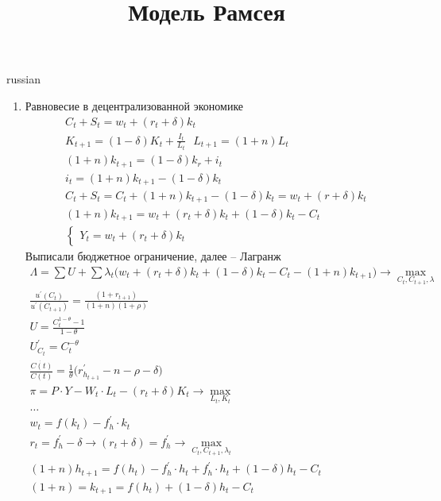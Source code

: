 \documentclass{article}
\begin{document}
\title{\foreignlanguage{russian}{Модель Рамсея}}
\maketitle
\begin{otherlanguage*}{russian}
\begin{enumerate}
\item Равновесие в децентрализованной экономике
\begin{align*}
C_t + S_t = w_t + (r_t + \delta) k_t \\
K_{t+1} = (1 - \delta) K_t + \frac{I_t}{L_t} \,\,\,\, L_{t+1} = (1 + n) L_t \\
(1 + n) k_{t+1} = (1 - \delta) k_r + i_t \\ 
i_t = (1 + n) k_{t+1} - (1 - \delta) k_t \\ 
C_t + S_t = C_t + (1 + n) k_{t+1} - (1 - \delta) k_t = w_t + (r + \delta) k_t \\
(1 + n) k_{t+1} = w_t + (r_t + \delta) k_t + (1 - \delta) k_t - C_t  \\
\begin{cases}
Y_t = w_t + (r_t + \delta) k_t 
\end{cases}
\end{align*}
Выписали бюджетное ограничение, далее -- Лагранж
\begin{align*}
\Lambda = \sum U + \sum \lambda_t \Big( w_t + (r_t + \delta) k_t + (1 - \delta) k_t - C_t - (1+n) k_{t+1} \Big) \rightarrow \max_{C_t, C_{t+1}, \lambda} \\
\frac{u^{'}(C_t)}{u^{'}(C_{t+1})} = \frac{(1 + r_{t+1})}{(1+n) (1 + \rho)} \\
U = \frac{C_t^{1 - \theta} - 1 }{1 - \theta} \\
U^{'}_{C_t} = C_t^{-\theta} \\
\frac{\dot{C(t)}}{C(t)} = \frac{1}{\theta} \Big( r^{'}_{h_{t+1}} - n -\rho - \delta \Big) \\
\pi = P \cdot Y - W_t \cdot L_t - (r_t + \delta) K_t \rightarrow \max_{L_t, K_t} \\
\ldots \\
w_t = f(k_t) - f^{'}_h \cdot k_t \\ 
r_t = f^{'}_h - \delta \rightarrow (r_t + \delta) = f^{'}_h \rightarrow \max_{C_t, C_{t+1}, \lambda_t} \\
(1 + n) h_{t+1} = f(h_t) - f^{'}_h \cdot h_t + f^{'}_h \cdot h_t + (1 - \delta) h_t - C_t \\
(1 + n) = k_{t+1} = f(h_t) + (1 - \delta) h_t - C_t \\

\end{align*}
\end{enumerate}
\end{otherlanguage*}
\end{document}
